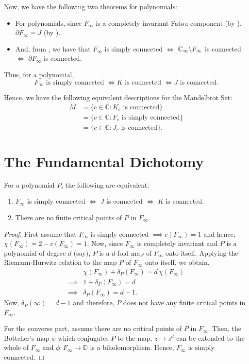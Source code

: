 \noindent Now, we have the following two theorems for polynomials:
\begin{itemize}
\item For polynomials, since \( F_\infty \) is a completely invariant Fatou component 
	(by ), \( \partial F_\infty=J \) (by ).
\item And, from , we have that \( F_\infty \) is simply connected \( \iff \)
	\( \mathbb{C}_\infty\backslash F_\infty \) is connected \( \iff \) \( \partial F_\infty \) is connected.
\end{itemize}
Thus, for a polynomial,\[
	F_\infty \text{ is simply connected } \iff K \text{ is connected } \iff J \text{ is connected}
.\]

\noindent Hence, we have the following equivalent descriptions for the Mandelbrot Set:
\begin{align*}
	M &=\{c\in \mathbb{C}:K_c \text{ is connected}\}\\
	  &=\{c\in \mathbb{C}:F_c \text{ is simply connected}\}\\
	  &=\{c\in \mathbb{C}:J_c \text{ is connected}\}
.\end{align*}

\section{The Fundamental Dichotomy}
\begin{theorem}
	For a polynomial \( P \), the following are equivalent:
	\begin{enumerate}
		\item \( F_\infty \) is simply connected \( \iff \) \( J \) is connected \( \iff \) \( K \) is connected.
		\item There are no finite critical points of \( P \) in \( F_\infty \).
	\end{enumerate}
\end{theorem}
\begin{proof}
	First assume that \( F_\infty \) is simply connected \( \implies c(F_\infty)=1 \) and hence, \( \chi(F_\infty)=2-c(F_\infty)=1 \).
	Now, since \( F_\infty \) is completely invariant and \( P \) is a polynomial of degree \( d \) (say), \( P \) is a \( d \)-fold
	map of \( F_\infty \) onto itself.
	Applying the Riemann-Hurwitz relation to the map \( P \) of \( F_\infty \) onto itself, we obtain,
	\begin{align*}
		&\chi(F_\infty)+\delta_P(F_\infty)=d\,\chi(F_\infty)\\
		\implies & 1+\delta_P(F_\infty)=d\\
		\implies & \delta_P(F_\infty)=d-1
	.\end{align*}
	Now, \( \delta_P(\infty)=d-1 \) and therefore, \( P \) does not have any finite critical points in \( F_\infty \).

	For the converse part, assume there are no critical points of \( P \) in \( F_\infty \). Then, the Bottcher's map \( \phi \) which
	conjugates \( P \) to the map, \( z\mapsto z^d \) can be extended to the whole of \( F_\infty \) and \( \phi:F_\infty\to \mathbb{D} \)
	is a biholomorphism. Hence, \( F_\infty \) is simply connected.
\end{proof}

